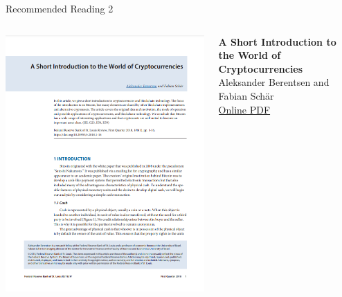 \documentclass[]{beamer}
\begin{document}
\begin{frame}{Recommended Reading 2}
\begin{columns}
	\begin{column}{0.3\textwidth}
	\center
	\includegraphics[width=\textwidth , frame]{../assets/images/short-introduction-cryptocurrencies.png}
	\end{column}
	\begin{column}{0.7\textwidth}
	\textbf{A Short Introduction to the World of Cryptocurrencies} \\
	Aleksander Berentsen and Fabian Schär \\
	\link \href{https://files.stlouisfed.org/files/htdocs/publications/review/2018/01/10/a-short-introduction-to-the-world-of-cryptocurrencies.pdf}{Online PDF}
	\end{column}
\end{columns}
\end{frame}

%	
%	
\end{document}

